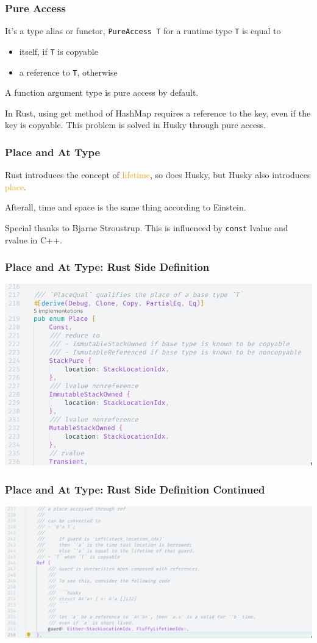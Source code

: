 \documentclass{beamer}   	%
\theoremstyle{definition}
\newcommand{\husky}[1]{\texttt{#1}}
\newcommand{\cpp}[1]{\texttt{#1}}
\begin{document}
\begin{frame}
\frametitle{Pure Access}

It's a type alias or functor, \husky{PureAccess T} for a runtime type \husky{T} is equal to
\begin{itemize}
	\item itself, if \husky{T} is copyable
	\item a reference to \husky{T}, otherwise
\end{itemize}

A function argument type is pure access by default.

In Rust, using get method of HashMap requires a reference to the key, even if the key is copyable. This problem is solved in Husky through pure access.
\end{frame}

\begin{frame}
\frametitle{Place and At Type}
Rust introduces the concept of \textcolor{orange}{lifetime}, so does Husky, but Husky also introduces \textcolor{orange}{place}. 

{\color{gray}Afterall, time and space is the same thing according to Einstein.}

Special thanks to Bjarne Stroustrup. This is influenced by \cpp{const} lvalue and rvalue in C++.
\end{frame}

\begin{frame}
\frametitle{Place and At Type: Rust Side Definition}

\includegraphics[width=\linewidth]{snapshots/husky_place_defn00.png}
\end{frame}

\begin{frame}
\frametitle{Place and At Type: Rust Side Definition Continued}

\includegraphics[width=\linewidth]{snapshots/husky_place_defn01.png}
\end{frame}
\end{document}
